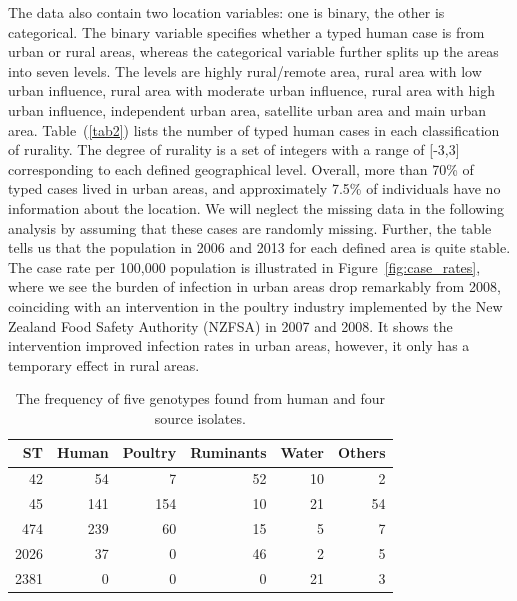 \documentclass[times, doublespace]{simauth}%
\begin{document}
The data also contain two location variables: one is binary, the other is categorical. The binary variable specifies whether a typed human case is from urban or rural areas, whereas the categorical variable further splits up the areas into seven levels. The levels are highly rural/remote area, rural area with low urban influence, rural area with moderate urban influence, rural area with high urban influence, independent urban area, satellite urban area and main urban area. Table~(\ref{tab2}) lists the number of typed human cases in each classification of rurality. The degree of rurality is a set of integers with a range of [-3,3] corresponding to each defined geographical level. Overall, more than 70\% of typed cases lived in urban areas, and approximately 7.5\% of individuals have no information about the location. We will neglect the missing data in the following analysis by assuming that these cases are randomly missing. Further, the table tells us that the population in 2006 and 2013 for each defined area \cite{Stat1, Stat2} is quite stable. The case rate per 100,000 population is illustrated in Figure~\ref{fig:case_rates}, where we see the burden of infection in urban areas drop remarkably from 2008, coinciding with an intervention in the poultry industry implemented by the New Zealand Food Safety Authority (NZFSA) in 2007 and 2008. It shows the intervention improved infection rates in urban areas, however, it only has a temporary effect in rural areas.

\begin{table}
  \begin{center}
    \begin{tabular}{rrrrrr}
      \toprule
      ST & Human & Poultry & Ruminants & Water & Others\\ \midrule
      42 & 54 & 7 & 52 & 10 & 2\\
      45  & 141 & 154 & 10 & 21 & 54\\
      474 & 239 & 60 & 15 & 5 & 7\\
      2026 & 37 & 0 & 46 & 2 & 5\\
      2381 & 0 & 0 & 0 & 21 & 3\\
      \bottomrule
    \end{tabular}
  \end{center}
  \caption{The frequency of five genotypes found from human and four source isolates.}
  \label{tab:counts}
\end{table}
\end{document}
